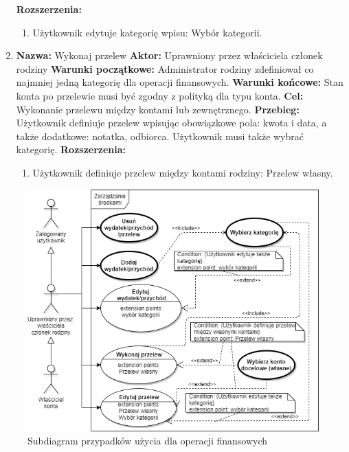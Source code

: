 \begin{enumerate}[labelwidth=1em,label=\arabic*.]
    \textbf{Rozszerzenia: } 
    \begin{enumerate}[label=\alph*)]
        \item Użytkownik edytuje kategorię wpisu: Wybór kategorii.
    \end{enumerate}
\item \textbf{Nazwa:} Wykonaj przelew \newline
    \textbf{Aktor:} Uprawniony przez właściciela członek rodziny \newline
    \textbf{Warunki początkowe:} Administrator rodziny zdefiniował co najmniej jedną kategorię dla operacji finansowych. \newline
    \textbf{Warunki końcowe:} Stan konta po przelewie musi być zgodny z polityką dla typu konta. \newline
    \textbf{Cel:} Wykonanie przelewu między kontami lub zewnętrznego. \newline
    \textbf{Przebieg:} Użytkownik definiuje przelew wpisując obowiązkowe pola: kwota i data, a także dodatkowe: notatka, odbiorca. Użytkownik musi także wybrać kategorię. \newline
    \textbf{Rozszerzenia: }
    \begin{enumerate}[label=\alph*)]
        \item Użytkownik definiuje przelew między kontami rodziny: Przelew własny.
    \end{enumerate}
\end{enumerate}

\begin{figure}[t]
	\centering
	\includegraphics[width=.7\linewidth]{rys03/use-case-money.png}
	\caption{Subdiagram przypadków użycia dla operacji finansowych}
	\label{fig:use-case-money}
\end{figure}


